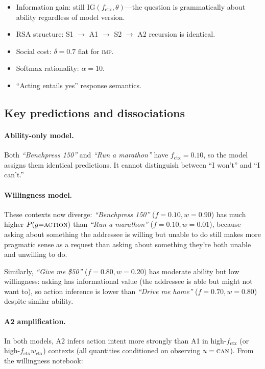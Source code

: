 \documentclass[11pt]{article}
\begin{document}
\begin{itemize}
  \item Information gain: still $\mathrm{IG}(f_{\text{ctx}}, \theta)$---the question
        is grammatically about ability regardless of model version.
  \item RSA structure: S1 $\to$ A1 $\to$ S2 $\to$ A2 recursion is identical.
  \item Social cost: $\delta = 0.7$ flat for \textsc{imp}.
  \item Softmax rationality: $\alpha = 10$.
  \item ``Acting entails yes'' response semantics.
\end{itemize}

\subsection{Key predictions and dissociations}

\paragraph{Ability-only model.} Both \emph{``Benchpress 150''} and
\emph{``Run a marathon''} have $f_{\text{ctx}} = 0.10$, so the model assigns
them identical predictions. It cannot distinguish between ``I won't'' and
``I can't.''

\paragraph{Willingness model.} These contexts now diverge: \emph{``Benchpress 150''}
($f{=}0.10, w{=}0.90$) has much higher $P(g{=}\textsc{action})$ than
\emph{``Run a marathon''} ($f{=}0.10, w{=}0.01$), because asking about something
the addressee is willing but unable to do still makes more pragmatic sense as a
request than asking about something they're both unable and unwilling to do.

Similarly, \emph{``Give me \$50''} ($f{=}0.80, w{=}0.20$) has moderate ability but
low willingness: asking has informational value (the addressee is able but might
not want to), so action inference is lower than \emph{``Drive me home''}
($f{=}0.70, w{=}0.80$) despite similar ability.

\paragraph{A2 amplification.} In both models, A2 infers action intent more strongly than A1 in
high-$f_{\text{ctx}}$ (or high-$f_{\text{ctx}} w_{\text{ctx}}$) contexts
(all quantities conditioned on observing $u = \textsc{can}$).
From the willingness notebook:
\end{document}
